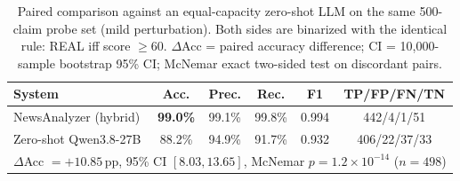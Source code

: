 
\begin{table}[!htbp]
\caption{Paired comparison against an equal-capacity zero-shot LLM on the same 500-claim probe set (mild perturbation). Both sides are binarized with the identical rule: REAL iff score $\ge 60$. $\Delta$Acc = paired accuracy difference; CI = 10{,}000-sample bootstrap 95\% CI; McNemar exact two-sided test on discordant pairs.}
\label{tab:fair}
\centering
\begin{tabular}{lccccc}
\toprule
\textbf{System} & \textbf{Acc.} & \textbf{Prec.} & \textbf{Rec.} & \textbf{F1} & \textbf{TP/FP/FN/TN} \\
\midrule
NewsAnalyzer (hybrid) & \textbf{99.0\%} & 99.1\% & 99.8\% & 0.994 & 442/4/1/51 \\
Zero-shot Qwen3.8-27B & 88.2\% & 94.9\% & 91.7\% & 0.932 & 406/22/37/33 \\
\midrule
\multicolumn{6}{l}{$\Delta$Acc $= +10.85$\,pp, 95\% CI $[8.03, 13.65]$, McNemar $p = 1.2\times10^{-14}$ ($n=498$)} \\
\bottomrule
\end{tabular}
\end{table}

